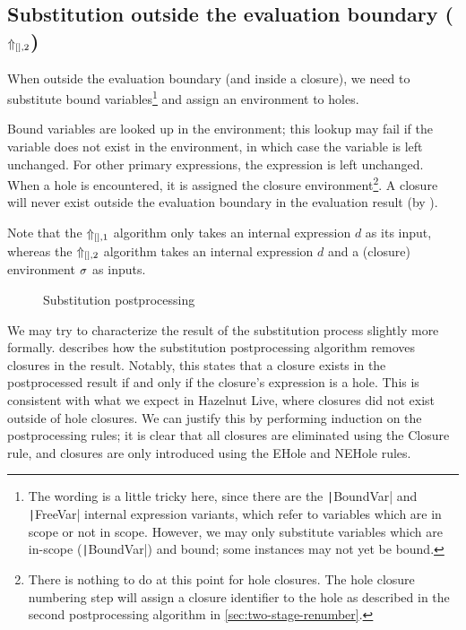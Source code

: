 \subsection{Substitution outside the evaluation boundary ($\Uparrow_{[],2}$)}
\label{sec:postprocessing-subst-outside}

When outside the evaluation boundary (and inside a closure), we need to substitute bound variables\footnote{The wording is a little tricky here, since there are the \texttt|BoundVar| and \texttt|FreeVar| internal expression variants, which refer to variables which are in scope or not in scope. However, we may only substitute variables which are in-scope (\texttt|BoundVar|) and bound; some instances may not yet be bound.} and assign an environment to holes.

Bound variables are looked up in the environment; this lookup may fail if the variable does not exist in the environment, in which case the variable is left unchanged. For other primary expressions, the expression is left unchanged. When a hole is encountered, it is assigned the closure environment\footnote{There is nothing to do at this point for hole closures. The hole closure numbering step will assign a closure identifier to the hole as described in the second postprocessing algorithm in \cref{sec:two-stage-renumber}.}. A closure will never exist outside the evaluation boundary in the evaluation result (by ).

Note that the $\Uparrow_{[],1}$ algorithm only takes an internal expression $d$ as its input, whereas the $\Uparrow_{[],2}$ algorithm takes an internal expression $d$ and a (closure) environment $\sigma$ as inputs.


\begin{figure}
  \centering
  \begin{mdframed}
    \begin{singlespace}
      
    \end{singlespace}
  \end{mdframed}
  \caption{Substitution postprocessing}
  \label{fig:big-step-inside-formal}
\end{figure}

We may try to characterize the result of the substitution process slightly more formally.  describes how the substitution postprocessing algorithm removes closures in the result. Notably, this states that a closure exists in the postprocessed result if and only if the closure's expression is a hole. This is consistent with what we expect in Hazelnut Live, where closures did not exist outside of hole closures. We can justify this by performing induction on the postprocessing rules; it is clear that all closures are eliminated using the \pplcl{}Closure rule, and closures are only introduced using the \pplclo{}EHole and \pplclo{}NEHole rules.


